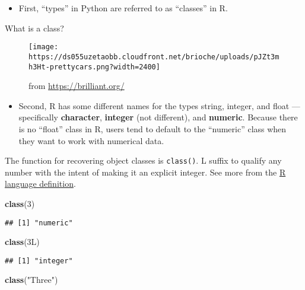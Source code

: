 \documentclass[
]{book}
\newenvironment{Shaded}{\begin{snugshade}}{\end{snugshade}}
\newcommand{\DecValTok}[1]{\textcolor[rgb]{0.00,0.00,0.81}{#1}}
\newcommand{\KeywordTok}[1]{\textcolor[rgb]{0.13,0.29,0.53}{\textbf{#1}}}
\newcommand{\NormalTok}[1]{#1}
\newcommand{\StringTok}[1]{\textcolor[rgb]{0.31,0.60,0.02}{#1}}
\providecommand{\tightlist}{%
  \setlength{\itemsep}{0pt}\setlength{\parskip}{0pt}}
\begin{document}
\begin{itemize}
\tightlist
\item
  First, ``types'' in Python are referred to as ``classes'' in R.
\end{itemize}

What is a class?

\begin{figure}
\centering
\texttt{[image: https://ds055uzetaobb.cloudfront.net/brioche/uploads/pJZt3mh3Ht-prettycars.png?width=2400]}
\caption{from \url{https://brilliant.org/}}
\end{figure}

\begin{itemize}
\tightlist
\item
  Second, R has some different names for the types string, integer, and float --- specifically \textbf{character}, \textbf{integer} (not different), and \textbf{numeric}. Because there is no ``float'' class in R, users tend to default to the ``numeric'' class when they want to work with numerical data.
\end{itemize}

The function for recovering object classes is \texttt{class()}. L suffix to qualify any number with the intent of making it an explicit integer. See more from the \href{https://cran.r-project.org/doc/manuals/R-lang.html}{R language definition}.

\begin{Shaded}
\begin{Highlighting}[]
\KeywordTok{class}\NormalTok{(}\DecValTok{3}\NormalTok{)}
\end{Highlighting}
\end{Shaded}

\begin{verbatim}
## [1] "numeric"
\end{verbatim}

\begin{Shaded}
\begin{Highlighting}[]
\KeywordTok{class}\NormalTok{(3L)}
\end{Highlighting}
\end{Shaded}

\begin{verbatim}
## [1] "integer"
\end{verbatim}

\begin{Shaded}
\begin{Highlighting}[]
\KeywordTok{class}\NormalTok{(}\StringTok{"Three"}\NormalTok{)}
\end{Highlighting}
\end{Shaded}
\end{document}
